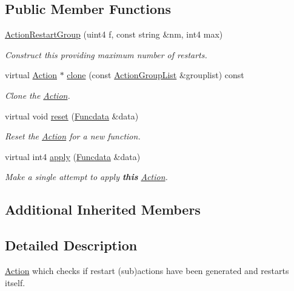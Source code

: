 \subsection*{Public Member Functions}
\begin{DoxyCompactItemize}
\item 
\mbox{\hyperlink{class_action_restart_group_af230c26a56dadb0f71c17f28ccc75876}{Action\+Restart\+Group}} (uint4 f, const string \&nm, int4 max)
\begin{DoxyCompactList}\small\item\em Construct this providing maximum number of restarts. \end{DoxyCompactList}\item 
virtual \mbox{\hyperlink{class_action}{Action}} $\ast$ \mbox{\hyperlink{class_action_restart_group_a2dd3daab632e0a41e64d9515f47c7200}{clone}} (const \mbox{\hyperlink{class_action_group_list}{Action\+Group\+List}} \&grouplist) const
\begin{DoxyCompactList}\small\item\em Clone the \mbox{\hyperlink{class_action}{Action}}. \end{DoxyCompactList}\item 
virtual void \mbox{\hyperlink{class_action_restart_group_a8a48151026811fbe97f4aa3eecf67cf0}{reset}} (\mbox{\hyperlink{class_funcdata}{Funcdata}} \&data)
\begin{DoxyCompactList}\small\item\em Reset the \mbox{\hyperlink{class_action}{Action}} for a new function. \end{DoxyCompactList}\item 
virtual int4 \mbox{\hyperlink{class_action_restart_group_ab597697ab15a9b8f1a25832f43bdeb0d}{apply}} (\mbox{\hyperlink{class_funcdata}{Funcdata}} \&data)
\begin{DoxyCompactList}\small\item\em Make a single attempt to apply {\bfseries{this}} \mbox{\hyperlink{class_action}{Action}}. \end{DoxyCompactList}\end{DoxyCompactItemize}
\subsection*{Additional Inherited Members}


\subsection{Detailed Description}
\mbox{\hyperlink{class_action}{Action}} which checks if restart (sub)actions have been generated and restarts itself. 

